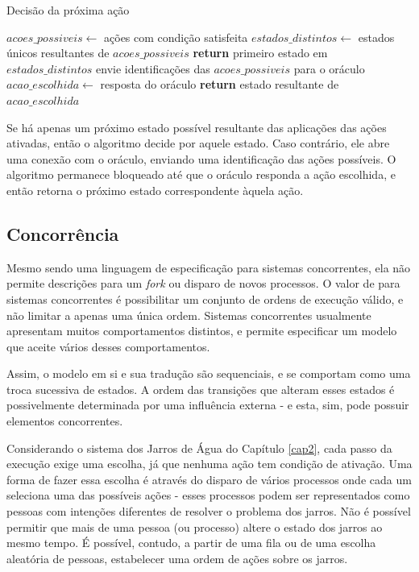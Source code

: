 \begin{algorithm}
\caption{Decisão da próxima ação}\label{alg:decide-action}
\begin{algorithmic}[1]
\State $acoes\_possiveis\gets$ ações com condição satisfeita
\State $estados\_distintos\gets$ estados únicos resultantes de $acoes\_possiveis$
\State \textbf{return} primeiro estado em $estados\_distintos$
\Else{}
\State envie identificações das $acoes\_possiveis$ para o oráculo
\State $acao\_escolhida\gets$ resposta do oráculo
\State \textbf{return} estado resultante de $acao\_escolhida$
\EndIf
\EndProcedure
\end{algorithmic}
\end{algorithm}

Se há apenas um próximo estado possível resultante das aplicações das ações
ativadas, então o algoritmo decide por aquele estado. Caso contrário, ele abre
uma conexão com o oráculo, enviando uma identificação das ações
possíveis. O algoritmo permanece bloqueado até que o oráculo responda a ação
escolhida, e então retorna o próximo estado correspondente àquela ação.


\subsection{Concorrência}

Mesmo \TLA sendo uma linguagem de especificação para sistemas concorrentes, ela
não permite descrições para um \textit{fork} ou disparo de novos
processos. O valor de \TLA para sistemas concorrentes é possibilitar um conjunto
de ordens de execução válido, e não limitar a apenas uma única ordem. Sistemas
concorrentes usualmente apresentam muitos comportamentos distintos, e \TLA
permite especificar um modelo que aceite vários desses comportamentos.

Assim, o modelo em si e sua tradução são sequenciais, e se comportam como uma troca
sucessiva de estados. A ordem das transições que alteram esses estados é
possivelmente determinada por uma influência externa - e esta, sim, pode possuir
elementos concorrentes.

Considerando o sistema dos Jarros de Água do Capítulo \ref{cap2}, cada passo da
execução exige uma escolha, já que nenhuma ação tem condição de ativação. Uma
forma de fazer essa escolha é através do disparo de vários processos onde cada
um seleciona uma das possíveis ações - esses processos podem ser representados
como pessoas com intenções diferentes de resolver o problema dos jarros. Não é
possível permitir que mais de uma pessoa (ou processo) altere o estado dos
jarros ao mesmo tempo. É possível, contudo, a partir de uma fila ou de uma
escolha aleatória de pessoas, estabelecer uma ordem de ações sobre os jarros.

